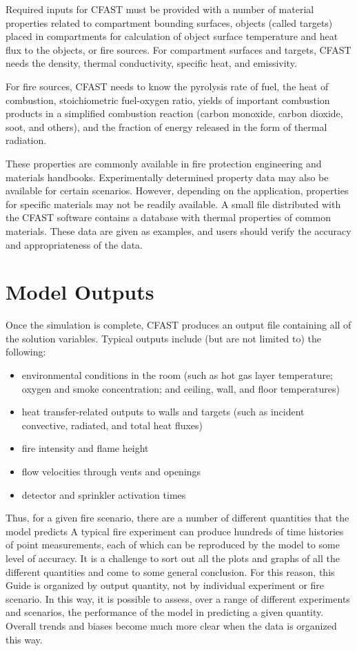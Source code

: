 Required inputs for CFAST must be provided with a number of material properties related to compartment bounding surfaces, objects (called targets) placed in compartments for calculation of object surface temperature and heat flux to the objects, or fire sources.  For compartment surfaces and targets, CFAST needs the density, thermal conductivity, specific heat, and emissivity.

For fire sources, CFAST needs to know the pyrolysis rate of fuel, the heat of combustion, stoichiometric fuel-oxygen ratio, yields of important combustion products in a simplified combustion reaction (carbon monoxide, carbon dioxide, soot, and others), and the fraction of energy released in the form of thermal radiation.

These properties are commonly available in fire protection engineering and materials handbooks. Experimentally determined property data may also be available for certain scenarios.  However, depending on the application, properties for specific materials may not be readily available.  A small file distributed with the CFAST software contains a database with thermal properties of common materials.  These data are given as examples, and users should verify the accuracy and appropriateness of the data.

\section{Model Outputs}

Once the simulation is complete, CFAST produces an output file containing all of the solution variables.  Typical outputs include (but are not limited to) the following:

\begin{itemize}
\item environmental conditions in the room (such as hot gas layer temperature; oxygen and smoke concentration; and ceiling, wall, and floor temperatures)
\item heat transfer-related outputs to walls and targets (such as incident convective, radiated, and total heat fluxes)
\item fire intensity and flame height
\item flow velocities through vents and openings
\item detector and sprinkler activation times
\end{itemize}


Thus, for a given fire scenario, there are a number of different quantities that the model predicts A typical
fire experiment can produce hundreds of time histories of point measurements, each of which can be reproduced by the model to some level of accuracy. It is a challenge to sort out all the plots and graphs of all the different quantities and come to some general conclusion. For this reason, this Guide
is organized by output quantity, not by individual experiment or fire scenario. In this way, it is possible to assess, over a range of different experiments and scenarios, the performance of the model in predicting a given quantity. Overall trends and biases become much more clear when the data is organized this way.


